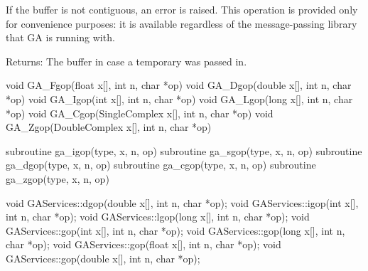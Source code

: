 \documentclass[10pt]{article}
\begin{document}
\begin{pydesc}
If the buffer is not contiguous, an error is raised. This operation is provided
only for convenience purposes: it is available regardless of the
message-passing library that GA is running with.

Returns: The buffer in case a temporary was passed in.
\end{pydesc}



\begin{capi}
\begin{ccode}
void GA_Fgop(float x[], int n, char *op)
void GA_Dgop(double x[], int n, char *op)
void GA_Igop(int x[], int n, char *op)
void GA_Lgop(long x[], int n, char *op)
void GA_Cgop(SingleComplex x[], int n, char *op)
void GA_Zgop(DoubleComplex x[], int n, char *op)
\end{ccode}
\begin{funcargs}
\end{funcargs}
\end{capi}

\begin{fapi}
\begin{fcode}
subroutine ga_igop(type, x, n, op)
subroutine ga_sgop(type, x, n, op)
subroutine ga_dgop(type, x, n, op)
subroutine ga_cgop(type, x, n, op)
subroutine ga_zgop(type, x, n, op)
\end{fcode}
\begin{funcargs}
\end{funcargs}
\end{fapi}

\begin{cxxapi}
\begin{cxxcode}
void GAServices::dgop(double x[], int n, char *op);
void GAServices::igop(int x[], int n, char *op);
void GAServices::lgop(long x[], int n, char *op);
void GAServices::gop(int x[], int n, char *op);
void GAServices::gop(long x[], int n, char *op);
void GAServices::gop(float x[], int n, char *op);
void GAServices::gop(double x[], int n, char *op);
\end{cxxcode}
\begin{funcargs}
\end{funcargs}
\end{cxxapi}
\end{document}

